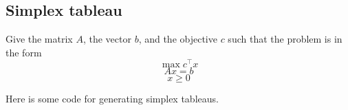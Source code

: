 %
%
%
%
%
%    
%    
%    
%    
%
%    
%    
%    
%    
%    

    
    \subsection{Simplex tableau}\label{simplex-tableau}
Give the matrix \(A\), the vector \(b\), and the objective \(c\) such
that the problem is in the form \[
\max c^\top x 
\] \[
Ax = b
\] \[
x \geq 0
\]

Here is some code for generating simplex tableaus.

